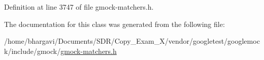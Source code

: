 Definition at line 3747 of file gmock-\/matchers.\+h.



The documentation for this class was generated from the following file\+:\begin{DoxyCompactItemize}
\item 
/home/bhargavi/\+Documents/\+S\+D\+R/\+Copy\+\_\+\+Exam\+\_\+X/vendor/googletest/googlemock/include/gmock/\hyperlink{gmock-matchers_8h}{gmock-\/matchers.\+h}\end{DoxyCompactItemize}

